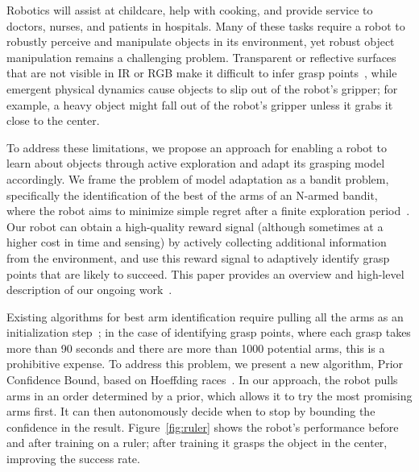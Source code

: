 \documentclass[conference,onecolumn]{IEEEtran}
\newcommand{\algorithmDTxt}{Prior Confidence Bound\xspace}
\begin{document}




%
\IEEEpeerreviewmaketitle



Robotics will assist at childcare, help with cooking, and provide
service to doctors, nurses, and patients in hospitals.  Many of these
tasks require a robot to robustly perceive and manipulate objects in
its environment, yet robust object manipulation remains a challenging
problem.  Transparent or reflective surfaces that are not visible in
IR or RGB make it difficult to infer grasp points~\citep{lysenkov13},
while emergent physical dynamics cause objects to slip out of the
robot's gripper; for example, a heavy object might fall out of the
robot's gripper unless it grabs it close to the center.

To address these limitations, we propose an approach for enabling a
robot to learn about objects through active exploration and adapt its
grasping model accordingly.  We frame the problem of model adaptation
as a bandit problem, specifically the identification of the best of
the arms of an N-armed bandit, ~\citep{thompson33} where the robot
aims to minimize simple regret after a finite exploration
period~\citep{bubeck09}.  Our robot can obtain a high-quality reward
signal (although sometimes at a higher cost in time and sensing) by
actively collecting additional information from the environment, and
use this reward signal to adaptively identify grasp points that are
likely to succeed.  This paper provides an overview and high-level
description of our ongoing work~\citep{oberlin15}.


Existing algorithms for best arm identification require pulling all
the arms as an initialization step~\citep{mannor04, audibert10,
  chen14}; in the case of identifying grasp points, where each grasp
takes more than 90 seconds 
and there are more than 1000 potential
arms, this is a prohibitive expense.  To address this problem, we
present a new algorithm, \algorithmDTxt, based on Hoeffding
races~\citep{maron93}. In our approach, the robot pulls arms in an
order determined by a prior, which allows it to try the most promising
arms first. It can then autonomously decide when to stop by bounding
the confidence in the result.  Figure~\ref{fig:ruler} shows the
robot's performance before and after training on a ruler; after
training it grasps the object in the center, improving the success
rate.
\end{document}
